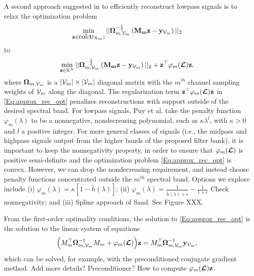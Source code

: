 \documentclass[journal, 10pt]{IEEEtran}
\begin{document}
A second approach suggested in \cite{PuyTGV15} to efficiently reconstruct lowpass signals is to relax the optimization problem
\begin{align*}
\min_{{\bf z} \in \hbox{col}({\bf U}_{{\cal R}_m})} ||{\boldsymbol \Omega}_{m,\V_m}^{-\frac{1}{2}}\left({\bf M_m z}-{{\bf y}_{\V_m}} \right) ||_2
\end{align*} 
to 
\begin{align}\label{Eq:approx_rec_opt}
\min_{{\bf z} \in \R^N} ||{\boldsymbol \Omega}_{m,\V_m}^{-\frac{1}{2}}\left({\bf M_m z}-{{\bf y}_{\V_m}} \right) ||_2+{\bf z}^{\top}\varphi_m(\L){\bf z},
\end{align} 
where ${\boldsymbol \Omega}_{m,{\mathcal{V}}_m}$ is a $|{\mathcal{V}}_m| \times |{\mathcal{V}}_m|$  diagonal matrix with the $m^{th}$ channel sampling weights of ${\mathcal{V}}_m$ along the diagonal. The regularization term ${\bf z}^{\top}\varphi_m(\boldsymbol{\mathcal{L}}){\bf z}$ in \eqref{Eq:approx_rec_opt} penalizes reconstructions with support outside of the desired spectral band. For lowpass signals, Puy et al. \cite{PuyTGV15} take the penalty function $\varphi_m(\lambda)$ to be a nonnegative, nondecreasing polynomial, such as $\kappa \lambda^l$, with $\kappa>0$ and $l$ a positive integer. For more general classes of signals (i.e., the midpass and highpass signals output from the higher bands of the proposed filter bank), it is important to keep the nonnegativity property, in order to ensure that $\varphi_m(\boldsymbol{\mathcal{L}})$ is positive semi-definite and the optimization problem \eqref{Eq:approx_rec_opt} is convex. However, we can drop the nondecreasing requirement, and instead choose penalty functions concentrated outside the $m^{th}$ spectral band. Options we explore include (i) $\varphi_m(\lambda)=\kappa\left[1-\tilde{h}(\lambda)\right]$; (ii) $\varphi_m(\lambda)=\frac{1}{\tilde{h}(\lambda)+\epsilon}-\frac{1}{1+\epsilon}$ {\color{red} Check nonnegativity}; and (iii) {\color{red} Spline approach of Saad. See Figure XXX.}

From the first-order optimality conditions, the solution to \eqref{Eq:approx_rec_opt} is the solution to the linear system of equations
\begin{align}\label{Eq:approx_rec_sol}
\Bigl(M_m^{\top}{\boldsymbol \Omega}_{m,\V_m}^{-1}M_m+\varphi_m(\L)\Bigr){\bf  z}=M_m^{\top}{\boldsymbol \Omega}_{m,\V_m}^{-1}{\bf y}_{\V_m},
\end{align}
which can be solved, for example, with the preconditioned conjugate gradient method. {\color{red}Add more details? Preconditioner? How to compute $\varphi_m(\boldsymbol{\mathcal{L}}){\bf z}$.}
\end{document}
